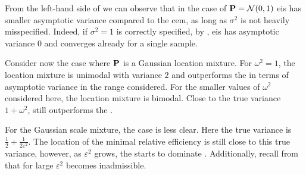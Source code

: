 From the left-hand side of  we can observe that in the case of $\P = \mathcal N(0,1)$ \acrshort{eis} has smaller asymptotic variance compared to the \acrshort{cem}, as long as $\sigma^{2}$ is not heavily misspecified. Indeed, if $\sigma^{2} = 1$ is correctly specified, by , \acrshort{eis} has asymptotic variance $0$ and converges already for a single sample. 

Consider now the case where $\P$ is a Gaussian location mixture. For $\omega^{2} = 1$, the location mixture is unimodal with variance $2$ and \aeis outperforms the \acem in terms of asymptotic variance in the range considered. For the smaller values of $\omega^{2}$ considered here, the location mixture is bimodal. Close to the true variance $1 + \omega^{2}$, \aeis still outperforms the \acem. 

For the Gaussian scale mixture, the case is less clear. Here the true variance is $\frac{1}{2} + \frac{1}{2 \varepsilon^{2}}$. The location of the minimal relative efficiency is still close to this true variance, however, as $\varepsilon^{2}$ grows, the \acem starts to dominate \aeis. Additionally, recall from  that for large $\varepsilon^{2}$ \aeis becomes inadmissible. 


